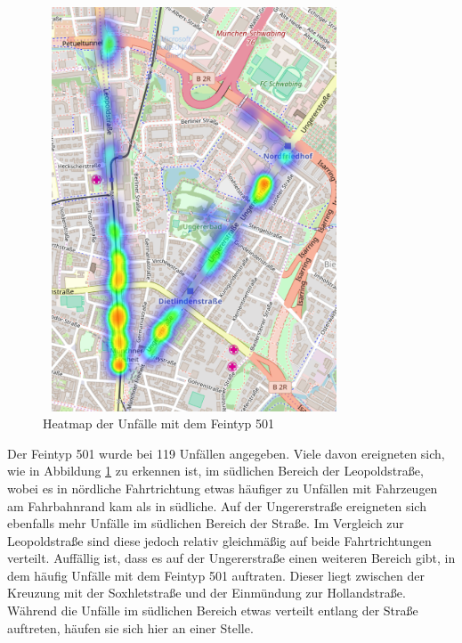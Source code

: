 \begin{savenotes}
	\begin{figure}[H]
		\centering
		\includegraphics[width=9cm,height=12cm]{figures/HM_501}
		\caption[Heatmap der Unfälle mit dem Feintyp 501]{Heatmap der Unfälle mit dem Feintyp 501}\label{fig:Heatmap_501}
	\end{figure}
\end{savenotes}

Der Feintyp 501 wurde bei 119 Unfällen angegeben. Viele davon ereigneten sich, wie in Abbildung \ref{fig:Heatmap_501} zu erkennen ist, im südlichen Bereich der Leopoldstraße, wobei es in nördliche Fahrtrichtung etwas häufiger zu Unfällen mit Fahrzeugen am Fahrbahnrand kam als in südliche. Auf der Ungererstraße ereigneten sich ebenfalls mehr Unfälle im südlichen Bereich der Straße. Im Vergleich zur Leopoldstraße sind diese jedoch relativ gleichmäßig auf beide Fahrtrichtungen verteilt. Auffällig ist, dass es auf der Ungererstraße einen weiteren Bereich gibt, in dem häufig Unfälle mit dem Feintyp 501 auftraten. Dieser liegt zwischen der Kreuzung mit der Soxhletstraße und der Einmündung zur Hollandstraße. Während die Unfälle im südlichen Bereich etwas verteilt entlang der Straße auftreten, häufen sie sich hier an einer Stelle.

